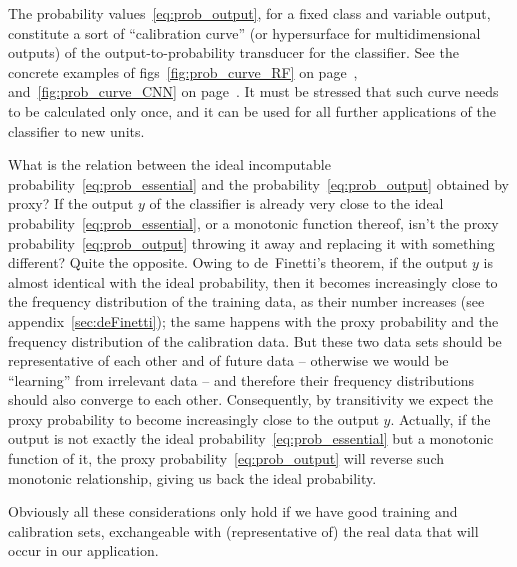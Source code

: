 \documentclass[\ifafour a4paper,12pt,\else a5paper,10pt,\fi%
onecolumn,oneside,article,%
british%
]{memoir}
\makeatletter
\theoremstyle{remark}
\theoremstyle{innote}
\def\sum{\DOTSI\sumop\slimits@}
\newcommand*{\amp}{\&}
\newcommand*{\pencil}{{\fontencoding{U}\fontfamily{fontawesometwo}\selectfont\symbol{210}}}
\newcommand{\mynotep}[1]{{\footnotesize\color{notecolour}\pencil\ #1}}
\renewcommand*{\P}{\mathrm{P}}%
\renewcommand*{\|}[1][]{\nonscript\:#1\vert\nonscript\:\mathopen{}}
\newcommand*{\figs}{figs}%
\newcommand*{\texts}[1]{\text{\small #1}}
\makeatother
\begin{document}
The probability values~\eqref{eq:prob_output}, for a fixed class and variable output, constitute a sort of \enquote{calibration curve} (or hypersurface for multidimensional outputs) of the output-to-probability transducer for the classifier. See the concrete examples of \figs~\ref{fig:prob_curve_RF} on page~\pageref{fig:prob_curve_RF}, and~\ref{fig:prob_curve_CNN} on page~\pageref{fig:prob_curve_CNN}. It must be stressed that such curve needs to be calculated only once, and it can be used for all further applications of the classifier to new units.

\medskip

What is the relation between the ideal incomputable probability~\eqref{eq:prob_essential} and the probability~\eqref{eq:prob_output} obtained by proxy? If the output $y$ of the classifier is already very close to the ideal probability~\eqref{eq:prob_essential}, or a monotonic function thereof, isn't the proxy probability~\eqref{eq:prob_output} throwing it away and replacing it with something different? Quite the opposite. Owing to de~Finetti's theorem, if the output $y$ is almost identical with the ideal probability, then it becomes increasingly close to the frequency distribution of the training data, as their number increases (see appendix~\ref{sec:deFinetti}); the same happens with the proxy probability and the frequency distribution of the calibration data. But these two data sets should be representative of each other and of future data -- otherwise we would be \enquote{learning} from irrelevant data -- and therefore their frequency distributions should also converge to each other. Consequently, by transitivity we expect the proxy probability to become increasingly close to the output $y$. Actually, if the output is not exactly the ideal probability~\eqref{eq:prob_essential} but a monotonic function of it, the proxy probability~\eqref{eq:prob_output} will reverse such monotonic relationship, giving us back the ideal probability.

Obviously all these considerations only hold if we have good training and calibration sets, exchangeable with (representative of) the real data that will occur in our application.

\end{document}
